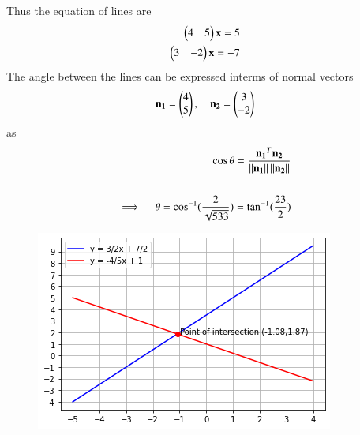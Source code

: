 \documentclass[journal,12pt,twocolumn]{IEEEtran}
\begin{document}
Thus the equation of lines are
\begin{align}
	\begin{pmatrix}4 & 5\end{pmatrix}\mathbf{x} = 5 \\
	\begin{pmatrix}3 & -2\end{pmatrix}\mathbf{x} = -7 
\end{align}
The angle between the lines can be expressed interms of normal vectors 
\begin{align}
	\mathbf{n_1}=\begin{pmatrix}4\\5\end{pmatrix} , \quad \mathbf{n_2}=\begin{pmatrix}3\\-2\end{pmatrix}
\end{align}
as
\begin{align}
	\cos\theta=\frac{\mathbf{n_1}^T\mathbf{n_2}}{\left\lVert\mathbf{n_1}\right\rVert\left\lVert\mathbf{n_2}\right\rVert} \\
				\nonumber \\
	\implies \quad \theta=\cos^{-1}({\frac{2}{\sqrt{533}}}) = \tan^{-1}(\frac{23}{2})
\end{align}
\begin{figure}[!h]
	\includegraphics[width=\columnwidth]{linespart2.png}
	\caption{} \label{linefig1}
\end{figure}
\end{document}
